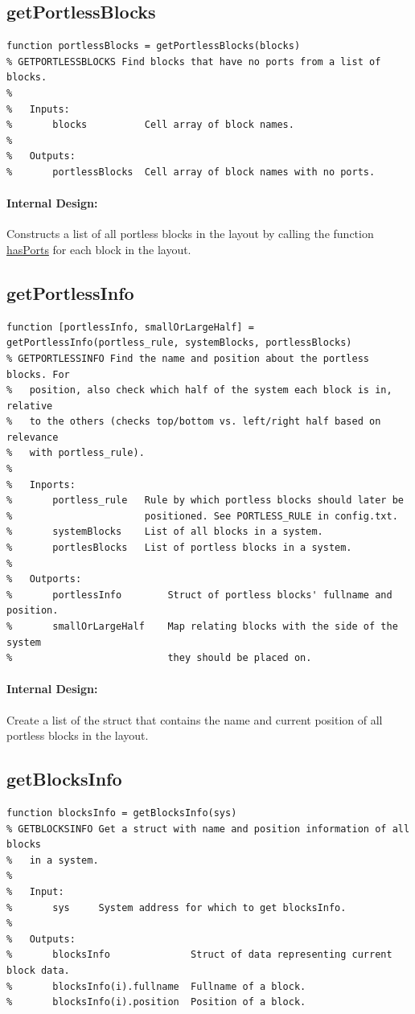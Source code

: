 \documentclass[12pt,letterpaper]{report}
\begin{document}
\subsection{getPortlessBlocks}
\begin{lstlisting}
function portlessBlocks = getPortlessBlocks(blocks)
% GETPORTLESSBLOCKS Find blocks that have no ports from a list of blocks.
%
%   Inputs:
%       blocks          Cell array of block names.
%
%   Outputs:
%       portlessBlocks  Cell array of block names with no ports.
\end{lstlisting}
\paragraph{Internal Design:} Constructs a list of all portless blocks in the layout by calling the function \hyperref[hasPorts]{hasPorts} for each block in the layout.

\subsection{getPortlessInfo}
\begin{lstlisting}
function [portlessInfo, smallOrLargeHalf] = getPortlessInfo(portless_rule, systemBlocks, portlessBlocks)
% GETPORTLESSINFO Find the name and position about the portless blocks. For
%   position, also check which half of the system each block is in, relative
%   to the others (checks top/bottom vs. left/right half based on relevance
%   with portless_rule).
%
%   Inports:
%       portless_rule   Rule by which portless blocks should later be
%                       positioned. See PORTLESS_RULE in config.txt.
%       systemBlocks    List of all blocks in a system.
%       portlesBlocks   List of portless blocks in a system.
%
%   Outports:
%       portlessInfo        Struct of portless blocks' fullname and position.
%       smallOrLargeHalf    Map relating blocks with the side of the system
%                           they should be placed on.
\end{lstlisting}
\paragraph{Internal Design:} Create a list of the struct that contains the name and current position of all portless blocks in the layout.

\subsection{getBlocksInfo}
\begin{lstlisting}
function blocksInfo = getBlocksInfo(sys)
% GETBLOCKSINFO Get a struct with name and position information of all blocks
%   in a system.
%
%   Input:
%       sys     System address for which to get blocksInfo.
%
%   Outputs:
%       blocksInfo              Struct of data representing current block data.
%       blocksInfo(i).fullname  Fullname of a block.
%       blocksInfo(i).position  Position of a block.
\end{lstlisting}
\end{document}
